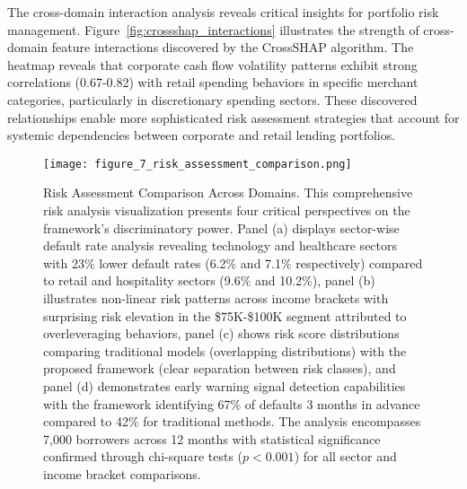 \documentclass[a4paper,11pt,twoside]{article}
\newcommand{\0}{\Bf{0}}
\theoremstyle{definition}
\begin{document}
The cross-domain interaction analysis reveals critical insights for portfolio risk management. Figure~\ref{fig:crossshap_interactions} illustrates the strength of cross-domain feature interactions discovered by the CrossSHAP algorithm. The heatmap reveals that corporate cash flow volatility patterns exhibit strong correlations (0.67-0.82) with retail spending behaviors in specific merchant categories, particularly in discretionary spending sectors. These discovered relationships enable more sophisticated risk assessment strategies that account for systemic dependencies between corporate and retail lending portfolios.

\begin{figure}[H]
\centering
\texttt{[image: figure\_7\_risk\_assessment\_comparison.png]}
\caption{Risk Assessment Comparison Across Domains. This comprehensive risk analysis visualization presents four critical perspectives on the framework's discriminatory power. Panel (a) displays sector-wise default rate analysis revealing technology and healthcare sectors with 23\% lower default rates (6.2\% and 7.1\% respectively) compared to retail and hospitality sectors (9.6\% and 10.2\%), panel (b) illustrates non-linear risk patterns across income brackets with surprising risk elevation in the \$75K-\$100K segment attributed to overleveraging behaviors, panel (c) shows risk score distributions comparing traditional models (overlapping distributions) with the proposed framework (clear separation between risk classes), and panel (d) demonstrates early warning signal detection capabilities with the framework identifying 67\% of defaults 3 months in advance compared to 42\% for traditional methods. The analysis encompasses 7,000 borrowers across 12 months with statistical significance confirmed through chi-square tests ($p < 0.001$) for all sector and income bracket comparisons.}
\label{fig:risk_assessment_comparison}
\end{figure}
\end{document}
